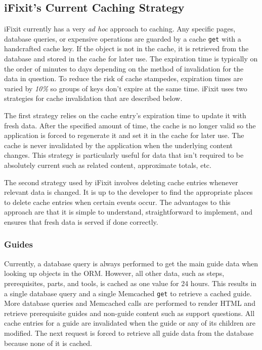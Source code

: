 \documentclass[12pt]{ucthesis}
\begin{document}
\subsection{iFixit's Current Caching Strategy} \label{currentCachingStrategy}
\textsf{iFixit} currently has a very \textit{ad hoc} approach to caching.
Any specific pages, database queries, or expensive operations are guarded by a cache {\tt get} with a handcrafted cache key.
If the object is not in the cache, it is retrieved from the database and stored in the cache for later use.
The expiration time is typically on the order of minutes to days depending on the method of invalidation for the data in question.
To reduce the risk of cache stampedes, expiration times are varied by \textit{10\%} so groups of keys don't expire at the same time.
\textsf{iFixit} uses two strategies for cache invalidation that are described below.

The first strategy relies on the cache entry's expiration time to update it with fresh data.
After the specified amount of time, the cache is no longer valid so the application is forced to regenerate it and set it in the cache for later use.
The cache is never invalidated by the application when the underlying content changes.
This strategy is particularly useful for data that isn't required to be absolutely current such as related content, approximate totals, etc.

The second strategy used by \textsf{iFixit} involves deleting cache entries whenever relevant data is changed.
It is up to the developer to find the appropriate places to delete cache entries when certain events occur.
The advantages to this approach are that it is simple to understand, straightforward to implement, and ensures that fresh data is served if done correctly.

\subsubsection{Guides}
Currently, a database query is always performed to get the main guide data when looking up objects in the ORM\@.
However, all other data, such as steps, prerequisites, parts, and tools, is cached as one value for 24 hours.
This results in a single database query and a single \textsf{Memcached} {\tt get} to retrieve a cached guide.
More database queries and \textsf{Memcached} calls are performed to render HTML and retrieve prerequisite guides and non-guide content such as support questions.
All cache entries for a guide are invalidated when the guide or any of its children are modified.
The next request is forced to retrieve all guide data from the database because none of it is cached.
\end{document}
